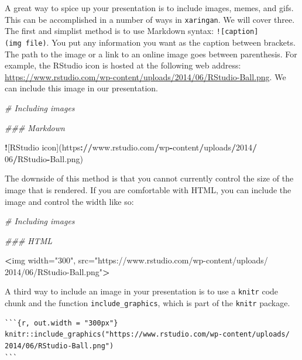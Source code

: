 \documentclass[
]{book}
\newenvironment{Shaded}{\begin{snugshade}}{\end{snugshade}}
\newcommand{\CommentTok}[1]{\textcolor[rgb]{0.37,0.37,0.37}{\textit{#1}}}
\newcommand{\DecValTok}[1]{\textcolor[rgb]{0.06,0.06,0.06}{#1}}
\newcommand{\ErrorTok}[1]{\textcolor[rgb]{0.14,0.14,0.14}{\textbf{#1}}}
\newcommand{\NormalTok}[1]{#1}
\newcommand{\OperatorTok}[1]{\textcolor[rgb]{0.43,0.43,0.43}{\textbf{#1}}}
\newcommand{\StringTok}[1]{\textcolor[rgb]{0.5,0.5,0.5}{#1}}
\begin{document}
A great way to spice up your presentation is to include images, memes, and gifs. This can be accomplished in a number of ways in \texttt{xaringan}. We will cover three. The first and simplist method is to use Markdown syntax: \texttt{!{[}caption{]}(img\ file)}. You put any information you want as the caption between brackets. The path to the image or a link to an online image goes between parenthesis. For example, the RStudio icon is hosted at the following web address: \url{https://www.rstudio.com/wp-content/uploads/2014/06/RStudio-Ball.png}. We can include this image in our presentation.

\begin{Shaded}
\begin{Highlighting}[]
\CommentTok{# Including images}

\CommentTok{### Markdown}

\OperatorTok{!}\NormalTok{[RStudio icon](https}\OperatorTok{:}\ErrorTok{//}\NormalTok{www.rstudio.com}\OperatorTok{/}\NormalTok{wp}\OperatorTok{-}\NormalTok{content}\OperatorTok{/}\NormalTok{uploads}\OperatorTok{/}\DecValTok{2014}\OperatorTok{/}
\DecValTok{06}\OperatorTok{/}\NormalTok{RStudio}\OperatorTok{-}\NormalTok{Ball.png)}
\end{Highlighting}
\end{Shaded}

The downside of this method is that you cannot currently control the size of the image that is rendered. If you are comfortable with HTML, you can include the image and control the width like so:

\begin{Shaded}
\begin{Highlighting}[]
\CommentTok{# Including images}

\CommentTok{### HTML}

\OperatorTok{<}\NormalTok{img width=}\StringTok{"300"}\NormalTok{, src=}\StringTok{"https://www.rstudio.com/wp-content/uploads/}
\StringTok{2014/06/RStudio-Ball.png"}\OperatorTok{>}
\end{Highlighting}
\end{Shaded}

A third way to include an image in your presentation is to use a \texttt{knitr} code chunk and the function \texttt{include\_graphics}, which is part of the \texttt{knitr} package.

\begin{verbatim}
```{r, out.width = "300px"}
knitr::include_graphics("https://www.rstudio.com/wp-content/uploads/
2014/06/RStudio-Ball.png")
```
\end{verbatim}
\end{document}
